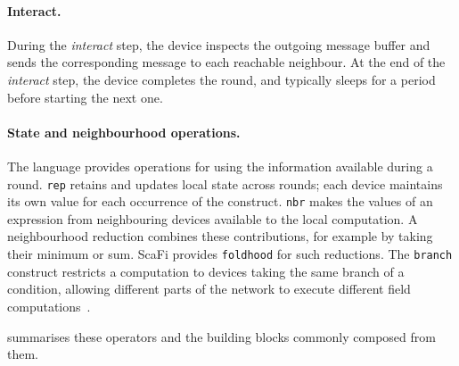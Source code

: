 \paragraph{Interact.}
During the \emph{interact} step,
the device inspects the outgoing message buffer and sends the corresponding message to each reachable neighbour.
%
At the end of the \emph{interact} step,
the device completes the round,
and typically sleeps for a period before starting the next one.

\paragraph{State and neighbourhood operations.}
The language provides operations for using the information available during a round.
\texttt{rep} retains and updates local state across rounds;
each device maintains its own value for each occurrence of the construct.
\texttt{nbr} makes the values of an expression from neighbouring devices available to the local computation.
A neighbourhood reduction combines these contributions,
for example by taking their minimum or sum.
ScaFi provides \texttt{foldhood} for such reductions.
The \texttt{branch} construct restricts a computation to devices taking the same branch of a condition,
allowing different parts of the network to execute different field computations~\cite{VIROLI2019100486,casadei2022scafi}.

 summarises these operators and the building blocks commonly composed from them.

